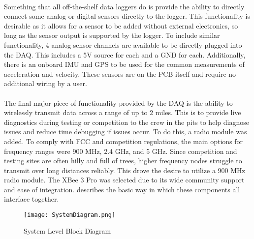 \paragraph{}
Something that all off-the-shelf data loggers do is provide the ability to directly connect some analog or digital sensors directly to the logger.
This functionality is desirable as it allows for a sensor to be added without external electronics, so long as the sensor output is supported by the logger.
To include similar functionality, 4 analog sensor channels are available to be directly plugged into the DAQ.
This includes a 5V source for each and a GND for each.
Additionally, there is an onboard IMU and GPS to be used for the common measurements of acceleration and velocity.
These sensors are on the PCB itself and require no additional wiring by a user.

\paragraph{}
The final major piece of functionality provided by the DAQ is the ability to wirelessly transmit data across a range of up to 2 miles.
This is to provide live diagnostics during testing or competition to the crew in the pits to help diagnose issues and reduce time debugging if issues occur.
To do this, a radio module was added.
To comply with FCC and competition regulations, the main options for frequency ranges were 900 MHz, 2.4 GHz, and 5 GHz.
Since competition and testing sites are often hilly and full of trees, higher frequency nodes struggle to transmit over long distances reliably.
This drove the desire to utilize a 900 MHz radio module.
The XBee 3 Pro was selected due to its wide community support and ease of integration.
 describes the basic way in which these components all interface together.

\begin{figure}[H]
	\centering
	\texttt{[image: SystemDiagram.png]}
	\caption{System Level Block Diagram}
	\label{fig:SysDiagram}
\end{figure}